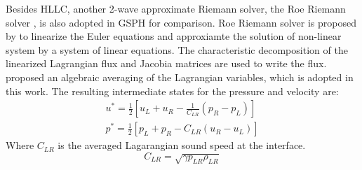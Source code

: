 \documentclass[review]{elsarticle}
\begin{document}
Besides HLLC, another 2-wave approximate Riemann solver, the Roe Riemann solver \citep{roe1981approximate}, is also adopted in GSPH for comparison.
Roe Riemann solver is proposed by \citet{roe1981approximate} to linearize the Euler equations and approxiamte the solution of non-linear system by a system of linear equations. The characteristic decomposition of the linearized Lagrangian flux and Jacobia matrices are used to write the flux. \citet{rider1994review} proposed an algebraic averaging of the Lagrangian variables, which is adopted in this work. The resulting intermediate states for the pressure and velocity are: 
\begin{eqnarray}
u^{\ast} = \frac{1}{2} \left[ u_L + u_R - \frac{1}{C_{LR}} (p_R - p_L) \right] \label{eq:RP-solver-ROE-u} \\
p^{\ast} = \frac{1}{2}\left[ p_L + p_R - C_{LR} (u_R - u_L) \right] \label{eq:RP-solver-ROE-p}
\end{eqnarray}
Where $C_{LR}$ is the averaged Lagarangian sound speed at the interface.
\begin{equation}
C_{LR} = \sqrt{\gamma p_{LR} \rho_{LR}}
\end{equation}
\end{document}
